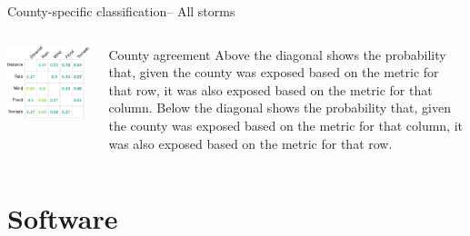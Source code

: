 \documentclass[ignorenonframetext,]{beamer}
\begin{document}
\begin{frame}{County-specific classification-- All storms}

\begin{columns}
\begin{column}{0.6\textwidth}

\includegraphics[width=\textwidth]{anderson_jan11_files/figure-beamer/unnamed-chunk-21-1} 
\end{column}
\begin{column}{0.4\textwidth}
\small
\begin{block}{County agreement}
Above the diagonal shows the probability that, given the county was exposed based on the metric for that row, it was also exposed based on the metric for that column. Below the diagonal shows the probability that, given the county was exposed based on the metric for that column, it was also exposed based on the metric for that row.
\end{block}
\end{column}
\end{columns}

\end{frame}

\section{Software}\label{software}
\end{document}
